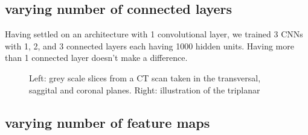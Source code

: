 \subsection{varying number of connected layers}

Having settled on an architecture with 1 convolutional layer, we trained 3 CNNs with 1, 2, and 3 connected layers each having 1000 hidden units. Having more than 1 connected layer doesn't make a difference.

\begin{figure}
\centering
\begin{minipage}{0.45\textwidth}
\centering
{}
\end{minipage}\hfill
\hspace{-1cm}
\begin{minipage}{0.45\textwidth}
\centering
{}
\end{minipage}
\caption{Left: grey scale slices from a CT scan taken in the transversal, saggital and coronal planes. Right: illustration of the triplanar}
\end{figure}

\subsection{varying number of feature maps}

